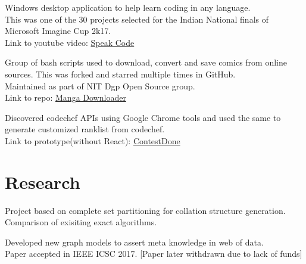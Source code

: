 \documentclass[letterpaper]{deedy-resume} %
\begin{document}
\begin{minipage}[t]{0.66\textwidth}

Windows desktop application to help learn coding in any language. \\
This was one of the 30 projects selected for the Indian National finals of Microsoft Imagine Cup 2k17. \\
Link to youtube video: \href{https://www.youtube.com/watch?v=hO4iSh1bSC0}{Speak Code}

\sectionspace


Group of bash scripts used to download, convert and save comics from online sources. This was forked and starred multiple times in GitHub. \\
Maintained as part of NIT Dgp Open Source group. \\
Link to repo: \href{https://github.com/NIT-dgp/manga}{Manga Downloader}

\sectionspace


Discovered codechef APIs using Google Chrome tools and used the same to generate customized ranklist from codechef. \\
Link to prototype(without React): \href{https://github.com/pandusonu2/ContestDone}{ContestDone}

\sectionspace


\section{Research}


Project based on complete set partitioning for collation structure generation. \\
Comparison of exisiting exact algorithms.

\sectionspace


Developed new graph models to assert meta knowledge in web of data. \\
Paper accepted in IEEE ICSC 2017. [Paper later withdrawn due to lack of funds]


\end{minipage}
\end{document}
